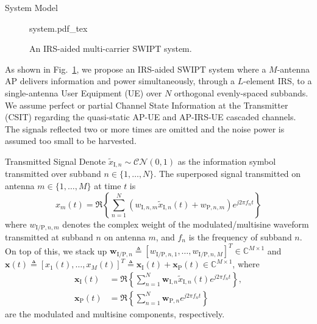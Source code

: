 \documentclass[journal]{IEEEtran}
\begin{document}
	\begin{section}{System Model}\label{se:system_model}
		\begin{figure}[!t]
			\centering
			\def\svgwidth{0.9\columnwidth}
			{system.pdf_tex}
			\caption{An IRS-aided multi-carrier SWIPT system.}
			\label{fi:system}
		\end{figure}

		As shown in Fig.~\ref{fi:system}, we propose an IRS-aided SWIPT system where a $M$-antenna AP delivers information and power simultaneously, through a $L$-element IRS, to a single-antenna User Equipment (UE) over $N$ orthogonal evenly-spaced subbands. We assume perfect or partial Channel State Information at the Transmitter (CSIT) regarding the quasi-static AP-UE and AP-IRS-UE cascaded channels. The signals reflected two or more times are omitted and the noise power is assumed too small to be harvested.


		\begin{subsection}{Transmitted Signal}
			Denote $\tilde{x}_{\mathrm{I},n}\sim\mathcal{CN}(0,1)$ as the information symbol transmitted over subband $n \in \{1, \dots, N\}$. The superposed signal transmitted on antenna $m \in \{1, \dots, M\}$ at time $t$ is
			\begin{equation}\label{eq:x_m}
				x_m(t)=\Re\left\{\sum_{n=1}^N\left({w_{\mathrm{I},n,m}\tilde{x}_{\mathrm{I},n}(t)}+w_{\mathrm{P},n,m}\right){e^{j2{\pi}{f_n}{t}}}\right\}
			\end{equation}
			where $w_{\mathrm{I/P},n,m}$ denotes the complex weight of the modulated/multisine waveform transmitted at subband $n$ on antenna $m$, and $f_n$ is the frequency of subband $n$. On top of this, we stack up $\boldsymbol{w}_{\mathrm{I/P},n} \triangleq [w_{\mathrm{I/P},n,1},\dots,w_{\mathrm{I/P},n,M}]^T \in \mathbb{C}^{M \times 1}$ and $\boldsymbol{x}(t) \triangleq [x_1(t),\dots,x_M(t)]^T \triangleq \boldsymbol{x}_{\mathrm{I}}(t)+\boldsymbol{x}_{\mathrm{P}}(t) \in \mathbb{C}^{M \times 1}$, where
			\begin{align}
				\boldsymbol{x}_{\mathrm{I}}(t) &= \Re{\left\{\sum_{n=1}^N\boldsymbol{w}_{\mathrm{I},n}\tilde{x}_{\mathrm{I},n}(t){e^{j2{\pi}{f_n}{t}}}\right\}},\label{eq:x_I}\\
				\boldsymbol{x}_{\mathrm{P}}(t) &= \Re{\left\{\sum_{n=1}^N\boldsymbol{w}_{\mathrm{P},n}{e^{j2{\pi}{f_n}{t}}}\right\}}\label{eq:x_P}
			\end{align}
			are the modulated and multisine components, respectively.
		\end{subsection}



\end{section}
\end{document}
